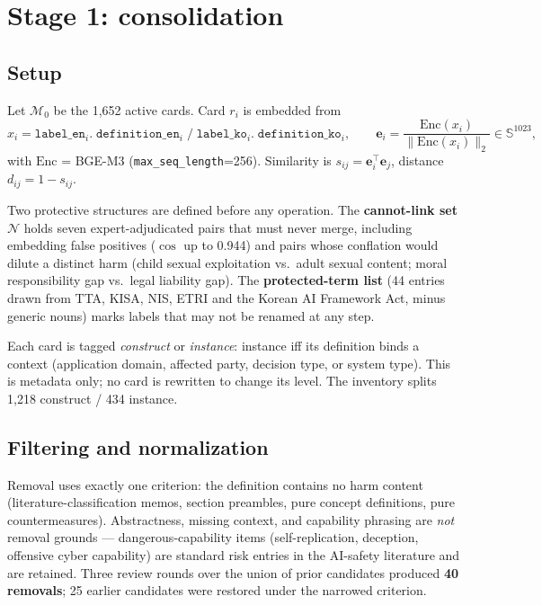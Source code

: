 \documentclass[11pt,a4paper]{article}
\newcommand{\cM}{\mathcal{M}}
\newcommand{\cN}{\mathcal{N}}
\begin{document}
\section{Stage 1: consolidation}

\subsection{Setup}

Let $\cM_0$ be the 1{,}652 active cards. Card $r_i$ is embedded from
\begin{equation}
x_i = \texttt{label\_en}_i \texttt{.}\; \texttt{definition\_en}_i \;\texttt{/}\; \texttt{label\_ko}_i \texttt{.}\; \texttt{definition\_ko}_i ,
\qquad
\mathbf{e}_i = \frac{\mathrm{Enc}(x_i)}{\lVert\mathrm{Enc}(x_i)\rVert_2} \in \mathbb{S}^{1023},
\end{equation}
with $\mathrm{Enc}$ = BGE-M3 (\texttt{max\_seq\_length}=256). Similarity is $s_{ij}=\mathbf{e}_i^\top\mathbf{e}_j$, distance $d_{ij}=1-s_{ij}$.

Two protective structures are defined before any operation. The \textbf{cannot-link set} $\cN$ holds seven expert-adjudicated pairs that must never merge, including embedding false positives ($\cos$ up to 0.944) and pairs whose conflation would dilute a distinct harm (child sexual exploitation vs.\ adult sexual content; moral responsibility gap vs.\ legal liability gap). The \textbf{protected-term list} (44 entries drawn from TTA, KISA, NIS, ETRI and the Korean AI Framework Act, minus generic nouns) marks labels that may not be renamed at any step.

Each card is tagged \emph{construct} or \emph{instance}: instance iff its definition binds a context (application domain, affected party, decision type, or system type). This is metadata only; no card is rewritten to change its level. The inventory splits 1{,}218 construct / 434 instance.

\subsection{Filtering and normalization}

Removal uses exactly one criterion: the definition contains no harm content (literature-classification memos, section preambles, pure concept definitions, pure countermeasures). Abstractness, missing context, and capability phrasing are \emph{not} removal grounds --- dangerous-capability items (self-replication, deception, offensive cyber capability) are standard risk entries in the AI-safety literature and are retained. Three review rounds over the union of prior candidates produced \textbf{40 removals}; 25 earlier candidates were restored under the narrowed criterion.
\end{document}

